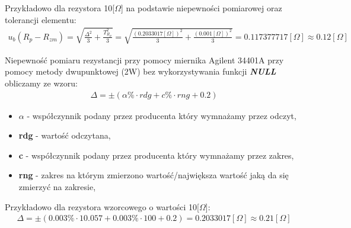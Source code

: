 \documentclass[11pt]{article}
\begin{document}
    Przykładowo dla rezystora 10[$\Omega$] na podstawie niepewności pomiarowej oraz tolerancji elementu:
    \begin{gather*}
        u_b(R_p-R_{zm})=\sqrt{\frac{\Delta^2}{3}+\frac{T_{R_p}^2}{3}}=\sqrt{\frac{(0.2033017[\Omega])^2}{3}+\frac{(0.001[\Omega])^2}{3}}=0.117377717[\Omega]\approx 0.12[\Omega]
    \end{gather*}

    Niepewność pomiaru rezystancji przy pomocy miernika Agilent 34401A przy pomocy metody dwupunktowej (2W) bez
    wykorzystywania funkcji \textbf{\textit{NULL}} obliczamy ze wzoru:
    \begin{gather*}
        \Delta=\pm(\alpha\%\cdot rdg + c\%\cdot rng + 0.2)
    \end{gather*}
    {\footnotesize
        \begin{itemize}
            \setlength\itemsep{0em}
            \item[] \boldmath$\alpha$ - współczynnik podany przez producenta który wymnażamy przez odczyt,
            \item[] \textbf{rdg} - wartość odczytana,
            \item[] \textbf{c} - współczynnik podany przez producenta który wymnażamy przez zakres,
            \item[] \textbf{rng} - zakres na którym zmierzono wartość/największa wartość jaką da się zmierzyć na zakresie,
        \end{itemize}}
    Przykładowo dla rezystora wzorcowego o wartości 10[$\Omega$]:
    \begin{gather*}
        \Delta=\pm(0.003\%\cdot 10.057 + 0.003\%\cdot 100 + 0.2)=0.2033017[\Omega]\approx 0.21[\Omega]
    \end{gather*}
\end{document}
